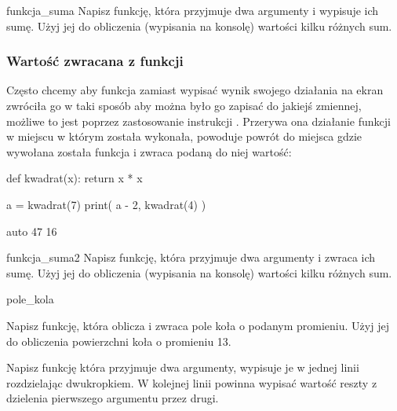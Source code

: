 \documentclass{pdfBooklets}
\begin{document}
\begin{Zadanie}{}{funkcja_suma}
Napisz funkcję, która przyjmuje dwa argumenty i wypisuje ich sumę. Użyj jej do obliczenia (wypisania na konsolę) wartości kilku różnych sum.
\end{Zadanie}

\subsubsection{Wartość zwracana z funkcji}

Często chcemy aby funkcja zamiast wypisać wynik swojego działania na ekran zwróciła go w taki sposób aby można było go zapisać do jakiejś zmiennej,
możliwe to jest poprzez zastosowanie instrukcji . Przerywa ona działanie funkcji w miejscu w którym została wykonała,
powoduje powrót do miejsca gdzie wywołana została funkcja i zwraca podaną do niej wartość:

\begin{CodeFrame}[python]{.5\textwidth}
def kwadrat(x):
  return x * x

a = kwadrat(7)
print( a - 2, kwadrat(4) )
\end{CodeFrame}
\begin{CodeFrame}{auto}
47 16
\end{CodeFrame}

\vspace{-13pt}

\begin{Zadanie}{}{funkcja_suma2}
Napisz funkcję, która przyjmuje dwa argumenty i zwraca ich sumę. Użyj jej do obliczenia (wypisania na konsolę) wartości kilku różnych sum.
\end{Zadanie}

\begin{Zadanie}{}{pole_kola}

Napisz funkcję, która oblicza i zwraca pole koła o podanym promieniu. Użyj jej do obliczenia powierzchni koła o promieniu 13.

\end{Zadanie}

\begin{Zadanie}{}{}

Napisz funkcję która przyjmuje dwa argumenty, wypisuje je w jednej linii rozdzielając dwukropkiem.
W kolejnej linii powinna wypisać wartość reszty z dzielenia pierwszego argumentu przez drugi.
\end{Zadanie}
\end{document}
